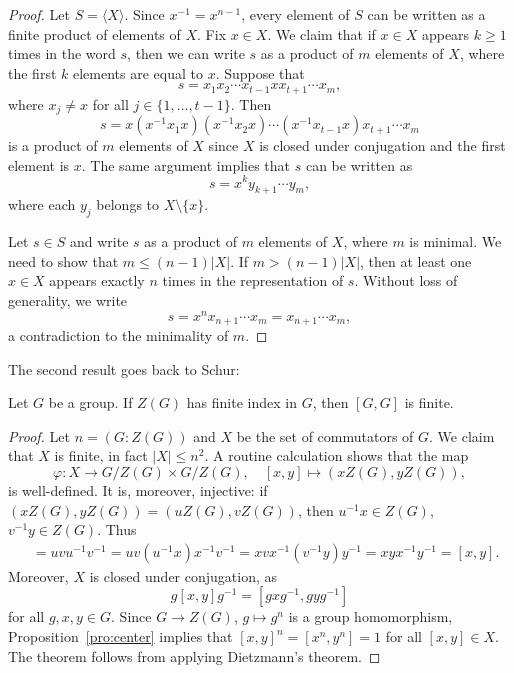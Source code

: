 \begin{proof}
	Let $S=\langle X\rangle$. Since $x^{-1}=x^{n-1}$, every element of $S$ can be 
	written as a finite product of elements of $X$. 
	Fix $x\in X$. We claim that if $x\in X$ appears $k\geq 1$ times 
	in the word $s$, then we can write $s$ as a product of $m$
	elements of $X$, where the first $k$ elements are equal to $x$. Suppose that 
	\[
	s=x_1x_2\cdots x_{t-1}xx_{t+1}\cdots x_m,
	\]
	where $x_j\ne x$ for all $j\in\{1,\dots,t-1\}$. Then 
	\[
		s=x(x^{-1}x_1x)(x^{-1}x_2x)\cdots (x^{-1}x_{t-1}x)x_{t+1}\cdots x_m
	\]
	is a product of $m$ elements of $X$ since $X$ is closed under conjugation and 
	the first element is $x$. The same argument implies that $s$
	can be written as 
	\[
		s=x^ky_{k+1}\cdots y_m,
	\]
	where each $y_j$ belongs to $X\setminus\{x\}$.

	Let $s\in S$ and write $s$ as a product of $m$ elements of 
	$X$, where $m$ is minimal. We need to show that 
	$m\leq (n-1)|X|$. 
	If $m>(n-1)|X|$, 
	then at least one $x\in X$ appears exactly $n$ 
	times in the representation of 
	$s$. Without loss of generality, we write 
	\[
		s=x^nx_{n+1}\cdots x_m=x_{n+1}\cdots x_m,
	\]
	a contradiction to the minimality of $m$. 
\end{proof}

The second result goes back to Schur:

\begin{theorem}[Schur]
\label{thm:Schur}
	Let $G$ be a group. 
	If $Z(G)$ has finite index in $G$, then $[G,G]$ is finite.
\end{theorem}

\begin{proof}
	Let $n=(G:Z(G))$ and  
	$X$ be the set of commutators of $G$. We claim that $X$ is finite, in fact
	$|X|\leq n^2$.
	A routine calculation shows that the map 
	\[
		\varphi\colon X\to G/Z(G)\times G/Z(G),\quad [x,y]\mapsto (xZ(G),yZ(G)),
	\]
	is well-defined. It is, moreover, 
	injective: if $(xZ(G),yZ(G))=(uZ(G),vZ(G))$, then $u^{-1}x\in Z(G)$, 
	$v^{-1}y\in Z(G)$. Thus 
	\begin{align*}
		[u,v]&=uvu^{-1}v^{-1}=uv(u^{-1}x)x^{-1}v^{-1}=xvx^{-1}(v^{-1}y)y^{-1}=xyx^{-1}y^{-1}=[x,y].
	\end{align*}
	Moreover, $X$ is closed under conjugation, as 
	\[
		g[x,y]g^{-1}=[gxg^{-1},gyg^{-1}]
	\]
	for all $g,x,y\in G$. Since $G\to Z(G)$, $g\mapsto g^n$ is a group
	homomorphism, Proposition~\ref{pro:center} implies that $[x,y]^n=[x^n,y^n]=1$ for
	all $[x,y]\in X$.  The theorem follows from applying Dietzmann's theorem. 
\end{proof}

